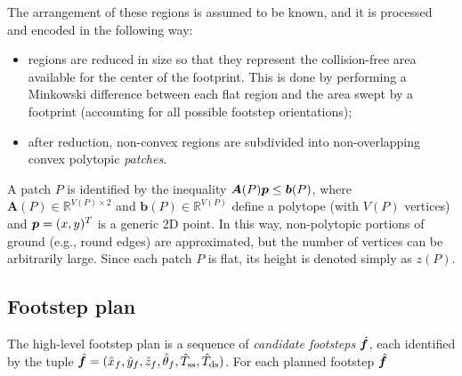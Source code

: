 The arrangement of these regions is assumed to be known, and it is processed and encoded in the following way:
\begin{itemize}
\item regions are reduced in size so that they represent the collision-free area available for the center of the footprint. This is done by performing a Minkowski difference between each flat region and the area swept by a footprint (accounting for all possible footstep orientations);
\item after reduction, non-convex regions are subdivided into non-overlapping convex polytopic {\em patches}.
\end{itemize}
A patch $P$ is identified by the inequality ${\bm{A}}(P) {\bm{p}} \le {\bm{b}}(P)$, where $\bm{A}(P) \in \mathbb{R}^{V(P) \times 2}$ and $\bm{b}(P) \in \mathbb{R}^{V(P)} $ define a polytope (with $V(P)$ vertices) and ${\bm{p}} = (x, y)^T$ is a generic 2D point. 
In this way, non-polytopic portions of ground (e.g., round edges) are approximated, but the number of vertices can be arbitrarily large.
Since each patch $P$ is flat, its height is denoted simply as $z(P)$.




\subsection{Footstep plan}

The high-level footstep plan is a sequence of {\em candidate footsteps} $\hat{{\bm{f}}}$, each identified by the tuple $\hat{{\bm{f}}} = (\hat x_f, \hat y_f, \hat z_f, \hat\theta_f, \hat T_{\rm ss}, \hat T_{\rm ds})$. For each planned footstep $\hat{{\bm{f}}}$

